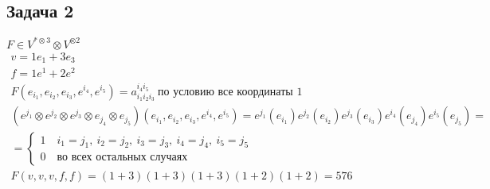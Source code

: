 \subsection*{Задача 2}
$F \in V^{* \otimes 3} \otimes V^{\otimes 2}$ 
\begin{gather*}
	v = 1e_1 + 3e_3\\
	f = 1e^1 + 2e^2\\
	F(e_{i_1}, e_{i_2}, e_{i_3}, e^{i_4}, e^{i_5}) = a_{i_1 i_2 i_3}^{i_4 i_5}\ \text{по условию все координаты 1}\\
	(e^{j_1} \otimes e^{j_2} \otimes e^{j_3} \otimes e_{j_4} \otimes e_{j_5})(e_{i_1}, e_{i_2}, e_{i_3}, e^{i_4}, e^{i_5}) = e^{j_1}(e_{i_1}) e^{j_2}(e_{i_2}) e^{j_3}(e_{i_3}) e^{i_4}(e_{j_4}) e^{i_5}(e_{j_5}) =\\
	=
	\begin{cases}
		1\quad i_1 = j_1,\ i_2 = j_2,\ i_3 = j_3,\ i_4 = j_4,\ i_5 = j_5\\
		0\quad \text{во всех остальных случаях}
	\end{cases}\\
	F(v,v,v,f,f) = (1+3)(1+3)(1+3)(1+2)(1+2) = 576
\end{gather*}



